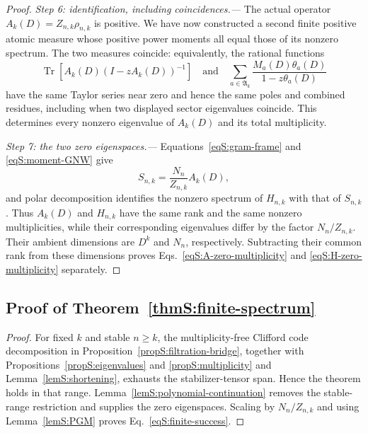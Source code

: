 \documentclass[journal,twocolumn]{IEEEtran}
\theoremstyle{definition}
\theoremstyle{plain}
\newcommand{\Tr}{\operatorname{Tr}}
\begin{document}
\begin{proof}
\emph{Step 6: identification, including coincidences.---}
The actual operator $A_k(D)=Z_{n,k}\rho_{n,k}$ is positive.  We have now
constructed a second finite positive atomic measure whose positive power
moments all equal those of its nonzero spectrum.  The two measures coincide:
equivalently, the rational functions
\begin{equation}
 \Tr\!\left[A_k(D)(I-zA_k(D))^{-1}\right]
 \quad\text{and}\quad
 \sum_{a\in\mathfrak A_k}
 \frac{M_a(D)\theta_a(D)}{1-z\theta_a(D)}
 \label{eqS:resolvents}
\end{equation}
have the same Taylor series near zero and hence the same poles and combined
residues, including when two displayed sector eigenvalues coincide.  This
determines every nonzero eigenvalue of $A_k(D)$ and its total multiplicity.

\emph{Step 7: the two zero eigenspaces.---}
Equations~\eqref{eqS:gram-frame} and \eqref{eqS:moment-GNW} give
\begin{equation}
 S_{n,k}=\frac{N_n}{Z_{n,k}}A_k(D),
 \label{eqS:frame-relation-scaling}
\end{equation}
and polar decomposition identifies the nonzero spectrum of $H_{n,k}$ with
that of $S_{n,k}$.  Thus $A_k(D)$ and $H_{n,k}$ have the same rank and the
same nonzero multiplicities, while their corresponding eigenvalues differ
by the factor $N_n/Z_{n,k}$.  Their ambient dimensions are $D^k$ and $N_n$,
respectively.  Subtracting their common rank from these dimensions proves
Eqs.~\eqref{eqS:A-zero-multiplicity} and
\eqref{eqS:H-zero-multiplicity} separately.
\end{proof}

\subsection{Proof of Theorem~\ref{thmS:finite-spectrum}}
\label{app:proof-finite-spectrum}

\begin{proof}
For fixed $k$ and stable $n\geq k$, the multiplicity-free Clifford code
decomposition in Proposition~\ref{propS:filtration-bridge}, together with
Propositions~\ref{propS:eigenvalues} and \ref{propS:multiplicity} and
Lemma~\ref{lemS:shortening}, exhausts the stabilizer-tensor span.  Hence the
theorem holds in that range.
Lemma~\ref{lemS:polynomial-continuation} removes the stable-range
restriction and supplies the zero eigenspaces.  Scaling by $N_n/Z_{n,k}$ and
using Lemma~\ref{lemS:PGM} proves Eq.~\eqref{eqS:finite-success}.
\end{proof}
\end{document}
